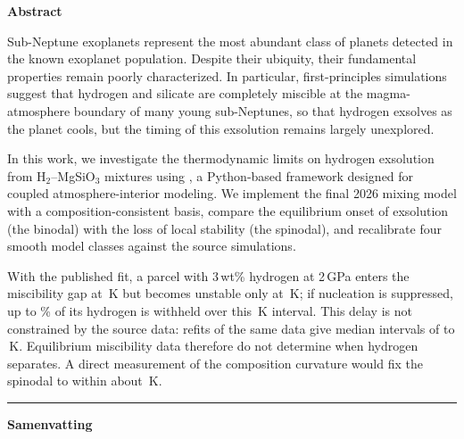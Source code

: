 \begin{center}\bfseries Abstract\end{center}
\begin{narrowtext}
Sub-Neptune exoplanets represent the most abundant class of planets detected in the known
exoplanet population. Despite their ubiquity, their fundamental properties remain poorly
characterized. In particular, first-principles simulations suggest that hydrogen and silicate
are completely miscible at the magma-atmosphere boundary of many young sub-Neptunes, so that
hydrogen exsolves as the planet cools, but the timing of this exsolution remains largely
unexplored.\par
\vspace{3pt}
In this work, we investigate the thermodynamic limits on hydrogen exsolution from
H$_2$--MgSiO$_3$ mixtures using \Atm{}, a Python-based framework designed for coupled
atmosphere-interior modeling. We implement the final 2026 mixing model with a
composition-consistent basis, compare the equilibrium onset of exsolution (the binodal) with
the loss of local stability (the spinodal), and recalibrate four smooth model classes against
the source simulations.\par
\vspace{3pt}
With the published fit, a parcel with 3\,wt\% hydrogen at 2\,GPa enters the miscibility gap at
\pubTbTwo{}\,K but becomes unstable only at \pubTspTwo{}\,K; if nucleation is suppressed, up
to \pubFhTwo{}\% of its hydrogen is withheld over this \pubIntTwo{}\,K interval. This delay is
not constrained by the source data: refits of the same data give median intervals of
\IntRangeLo{} to \IntRangeHi{}\,K. Equilibrium miscibility data therefore do not determine when
hydrogen separates. A direct measurement of the composition curvature would fix the spinodal
to within about \curvSdPooled{}\,K.
\end{narrowtext}
\vspace{10pt}
\noindent\rule{\textwidth}{0.6pt}
\vspace{10pt}
\begin{center}\bfseries Samenvatting\end{center}
